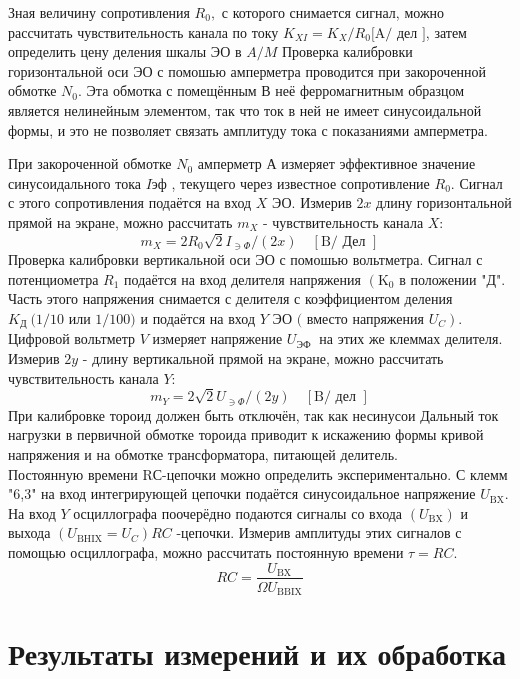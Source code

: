 \documentclass[a4paper,12pt]{article}
\begin{document}
Зная величину сопротивления $R_{0},$ с которого снимается сигнал, можно рассчитать чувствительность канала по току $K_{X I}=K_{X} / R_{0}[\mathrm{A} /$ дел $]$, затем определить цену деления шкалы ЭО в $A / M$
Проверка калибровки горизонтальной оси ЭО с помошью амперметра проводится при закороченной обмотке $N_{0} .$ Эта обмотка с помещённым В неё ферромагнитным образцом является нелинейным элементом, так что ток в ней не имеет синусоидальной формы, и это не позволяет связать амплитуду тока с показаниями амперметра.

При закороченной обмотке $N_{0}$ амперметр А измеряет эффективное значение синусоидального тока $I$эф , текущего через известное сопротивление $R_{0} .$ Сигнал с этого сопротивления подаётся на вход $X$ ЭО. Измерив $2 x$ длину горизонтальной прямой на экране, можно рассчитать $m_{X}$ - чувствительность канала $X:$
$$
m_{X}=2 R_{0} \sqrt{2} I_{\ni \Phi} /(2 x) \quad[\mathrm{B} / \text { Дел }]
$$
Проверка калибровки вертикальной оси ЭО с помошью вольтметра. Сигнал с потенциометра $R_{1}$ подаётся на вход делителя напряжения $\left(\mathrm{K}_{0}\right.$ в положении "Д". Часть этого напряжения снимается с делителя с коэффициентом деления $K_{\text {Д }}(1 / 10$ или $1 / 100)$ и подаётся на вход $Y$ ЭО $($ вместо напряжения $\left.U_{C}\right) .$ Цифровой вольтметр $V$ измеряет напряжение $U_{\text {ЭФ }}$ на этих же клеммах делителя. Измерив $2 y$ - длину вертикальной прямой на экране, можно рассчитать чувствительность канала $Y:$
$$
m_{Y}=2 \sqrt{2} U_{\ni \Phi} /(2 y) \quad[\mathrm{B} / \text { дел }]
$$
При калибровке тороид должен быть отключён, так как несинусои Дальный ток нагрузки в первичной обмотке тороида приводит к искажению формы кривой напряжения и на обмотке трансформатора, питающей делитель.\\
Постоянную времени RС-цепочки можно определить экспериментально. С клемм "6,3" на вход интегрирующей цепочки подаётся синусоидальное напряжение $U_{\mathrm{BX}} .$ На вход $Y$ осциллографа поочерёдно подаются сигналы со входа $\left(U_{\mathrm{BX}}\right)$ и выхода $\left(U_{\mathrm{BHIX}}=U_{C}\right) R C$ -цепочки. Измерив амплитуды этих сигналов с помощью осциллографа, можно рассчитать постоянную времени $\tau=R C .$
$$
R C=\frac{U_{\mathrm{BX}}}{\Omega U_{\mathrm{BBIX}}}
$$

\section{Результаты измерений и их обработка}
\end{document}
